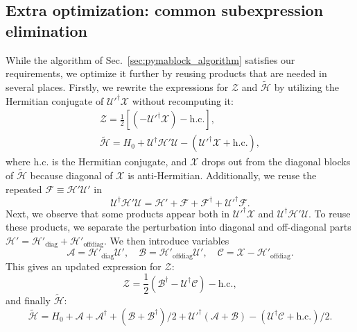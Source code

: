 \subsection{Extra optimization: common subexpression elimination}
While the algorithm of Sec.~\ref{sec:pymablock_algorithm} satisfies our
requirements, we optimize it further by reusing products that are needed in
several places.
Firstly, we rewrite the expressions for $\mathcal{Z}$ and $\tilde{\mathcal{H}}$
by utilizing the Hermitian conjugate of $\mathcal{U}'^\dagger \mathcal{X}$ without recomputing it:
%
\begin{gather*}
\mathcal{Z} = \frac{1}{2}[(-\mathcal{U}'^\dagger \mathcal{X})- \textrm{h.c.}],\\
\tilde{\mathcal{H}} = H_0 + \mathcal{U}^\dagger \mathcal{H}' \mathcal{U} - (\mathcal{U}'^\dagger \mathcal{X} + \textrm{h.c.}),
\end{gather*}
%
where $\textrm{h.c.}$ is the Hermitian conjugate, and $\mathcal{X}$ drops out from the diagonal blocks of $\tilde{\mathcal{H}}$ because diagonal of $\mathcal{X}$ is anti-Hermitian.
%
Additionally, we reuse the repeated $\mathcal{F} \equiv \mathcal{H}'\mathcal{U}'$
in
%
$$
\mathcal{U}^\dagger \mathcal{H}' \mathcal{U} = \mathcal{H}' + \mathcal{F} + \mathcal{F}^\dagger + \mathcal{U}'^\dagger \mathcal{F}.
$$
%
Next, we observe that some products appear both in $\mathcal{U}'^\dagger \mathcal{X}$ and $\mathcal{U}^\dagger \mathcal{H}' \mathcal{U}$.
%
To reuse these products, we separate the perturbation into diagonal and off-diagonal parts $\mathcal{H}' = \mathcal{H}'_\textrm{diag} + \mathcal{H}'_\textrm{offdiag}$.
%
We then introduce variables
%
\begin{equation}
\mathcal{A} = \mathcal{H}'_\textrm{diag} \mathcal{U}', \quad
\mathcal{B} = \mathcal{H}'_\textrm{offdiag} \mathcal{U}', \quad
\mathcal{C} = \mathcal{X} - \mathcal{H}'_\textrm{offdiag}.
\end{equation}
%
This gives an updated expression for $\mathcal{Z}$:
%
\begin{equation}
\label{eq:Z_optimized}
\mathcal{Z} = \frac{1}{2}(\mathcal{B}^\dagger - \mathcal{U}^\dagger\mathcal{C}) - \textrm{h.c.},
\end{equation}
%
and finally $\tilde{\mathcal{H}}$:
%
\begin{equation}
\label{eq:H_tilde_optimized}
\tilde{\mathcal{H}} = H_0 + \mathcal{A} + \mathcal{A}^\dagger + (\mathcal{B} + \mathcal{B}^\dagger)/2 + \mathcal{U}'^\dagger (\mathcal{A} + \mathcal{B}) - (\mathcal{U}^\dagger \mathcal{C} + \textrm{h.c.})/2.
\end{equation}
